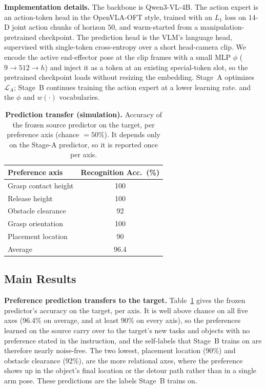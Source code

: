 \documentclass{article}
\begin{document}
\textbf{Implementation details.}
The backbone is Qwen3-VL-4B. 
The action expert is an action-token head in the OpenVLA-OFT style, trained with an $L_1$ loss on $14$-D joint action chunks of horizon $50$, and warm-started from a manipulation-pretrained checkpoint. 
The prediction head is the VLM's language head, supervised with single-token cross-entropy over a short head-camera clip. 
We encode the active end-effector pose at the clip frames with a small MLP $\phi$ ($9\!\to\!512\!\to\!h$) and inject it as a token at an existing special-token slot, so the pretrained checkpoint loads without resizing the embedding. 
Stage~A optimizes $\mathcal{L}_A$; Stage~B continues training the action expert at a lower learning rate.  and the $\phi$ and $w(\cdot)$ vocabularies.


\begin{table}[t]
  \centering
  \small
  \caption{\textbf{Prediction transfer (simulation).} Accuracy of the frozen
  source predictor on the target, per preference axis (chance $=50\%$). It
  depends only on the Stage-A predictor, so it is reported once per axis.}
  \label{tab:sim_recognition}
  \begin{tabular}{lc}
    \hline
    Preference axis & Recognition Acc.\ (\%) \\
    \hline
    Grasp contact height & 100 \\
    Release height       & 100 \\
    Obstacle clearance   & 92 \\
    Grasp orientation    & 100 \\
    Placement location   & 90 \\
    \hline
    Average              & 96.4 \\
    \hline
  \end{tabular}
\end{table}


\subsection{Main Results}
\label{sec:exp-main}

\textbf{Preference prediction transfers to the target.}
Table~\ref{tab:sim_recognition} gives the frozen predictor's accuracy on the
target, per axis. It is well above chance on all five axes (96.4\% on average,
and at least 90\% on every axis), so the preferences learned on the source carry
over to the target's new tasks and objects with no preference stated in the
instruction, and the self-labels that Stage~B trains on are therefore nearly
noise-free. The two lowest, placement location (90\%) and obstacle clearance
(92\%), are the more relational axes, where the preference shows up in the
object's final location or the detour path rather than in a single arm pose.
These predictions are the labels Stage~B trains on.
\end{document}

